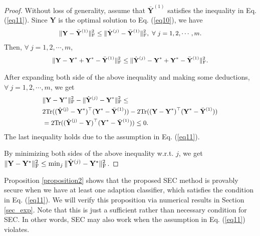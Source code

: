 \documentclass[10pt,journal,compsoc]{IEEEtran}
\begin{document}
\begin{proof}
Without loss of generality, assume that $\bar{\mathbf{Y}}^{(1)}$ satisfies the inequality in Eq. (\ref{eq11}). Since $\mathbf{Y}$ is the optimal solution to Eq. (\ref{eq10}), we have
\begin{equation}
\label{eq12}
\small{
\begin{split}
\|\mathbf{Y}- \bar{\mathbf{Y}}^{(1)}\|_{\rm{F}}^2 \leq \|\hat{\mathbf{Y}}^{(j)}- \bar{\mathbf{Y}}^{(1)}\|_{\rm{F}}^2, ~\forall~j=1,2,\cdots, m.
\end{split}}
\end{equation}
Then, $\forall~j=1, 2, \cdots, m$,
\begin{equation}
\label{eq13}
\small{
\begin{split}
\|\mathbf{Y}- \mathbf{Y}^{*} + \mathbf{Y}^{*}-\bar{\mathbf{Y}}^{(1)}\|_{\rm{F}}^2 \leq \|\hat{\mathbf{Y}}^{(j)}-\mathbf{Y}^{*}+\mathbf{Y}^{*}- \bar{\mathbf{Y}}^{(1)}\|_{\rm{F}}^2.
\end{split}}
\end{equation}

After expanding both side of the above inequality and making some deductions, $\forall~j=1, 2, \cdots, m$, we get
\begin{equation*}
\label{eq14}
\small{
\begin{split}
     &\|\mathbf{Y}- \mathbf{Y}^{*}\|_{\rm{F}}^2-\|\hat{\mathbf{Y}}^{(j)}-\mathbf{Y}^{*}\|_{\rm{F}}^2 \leq \\
 &2\rm{Tr}((\hat{\mathbf{Y}}^{(j)}-\mathbf{Y}^{*})^\top (\mathbf{Y}^{*}- \bar{\mathbf{Y}}^{(1)}))-
2\rm{Tr}((\mathbf{Y}- \mathbf{Y}^{*})^\top (\mathbf{Y}^{*}-\bar{\mathbf{Y}}^{(1)} ))\\
& = 2\rm{Tr}((\hat{\mathbf{Y}}^{(j)}-\mathbf{Y})^\top (\mathbf{Y}^{*}- \bar{\mathbf{Y}}^{(1)})) \leq 0.
\end{split}}
\end{equation*}
The last inequality holds due to the assumption in Eq. (\ref{eq11}).

By minimizing both sides of the above inequality w.r.t. $j$, we get $\|\mathbf{Y}- \mathbf{Y}^{*}\|_{\rm{F}}^2 \leq \min_j \| \hat{\mathbf{Y}}^{(j)}- \mathbf{Y}^{*}\|_{\rm{F}}^2$.
\end{proof}

Proposition \ref{proposition2} shows that the proposed SEC method is provably secure when we have at least one adaption classifier, which satisfies the condition in Eq. (\ref{eq11}). We will verify this proposition via numerical results in Section \ref{sec_exp}. Note that this is just a sufficient rather than necessary condition for SEC. In other words, SEC may also work when the assumption in Eq. (\ref{eq11}) violates.
\end{document}
